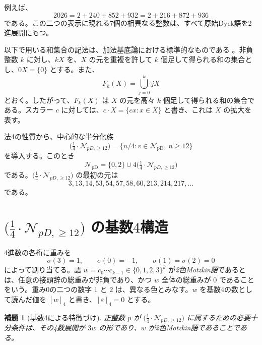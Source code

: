 \documentclass[12pt]{ltjsarticle}
\theoremstyle{plain}
\newtheorem{lemma}[theorem]{補題}
\theoremstyle{definition}
\theoremstyle{plain}
\newcommand{\NpD}{\mathcal{N}_{\mathrm{pD}}}
\newcommand{\Pset}{
  \bigl(\tfrac{1}{4}\cdot\mathcal{N}_{pD,\geq 12}\bigr)
}
\begin{document}
例えば、
\[
 2026=2+240+852+932=2+216+872+936
\]
である。この二つの表示に現れる7個の相異なる整数は、すべて原始Dyck語を2進展開にもつ。

以下で用いる和集合の記法は、加法基底論における標準的なものである \cite[Chap.\ 1]{Nathanson}。非負整数 $k$ に対し、$kX$ を、$X$ の元を重複を許して $k$ 個足して得られる和の集合とし、$0X=\{0\}$ とする。また、
\[
 F_k(X)=\bigcup_{j=0}^{k}jX
\]
とおく。したがって、$F_k(X)$ は $X$ の元を高々 $k$ 個足して得られる和の集合である。スカラー $c$ に対しては、$c\cdot X=\{cx:x\in X\}$ と書き、これは $X$ の拡大を表す。

法4の性質から、中心的な半分化族
\begin{equation}\label{eq:P-def}
 \Pset=\{n/4:v\in\NpD,\ n\geq12\}
\end{equation}
を導入する。このとき
\begin{equation}\label{eq:NpD-decomp}
 \NpD=\{0,2\}\cup4\Pset
\end{equation}
である。$\Pset$ の最初の元は
\[
 3,13,14,53,54,57,58,60,213,214,217,\ldots
\]
である。

\section{\texorpdfstring{$\Pset$}{P} の基数\texorpdfstring{$4$}{4}構造}\label{sec:base4}

4進数の各桁に重みを
\[
  \sigma(3)=1,\qquad \sigma(0)=-1,\qquad
  \sigma(1)=\sigma(2)=0
\]
によって割り当てる。語 $w=c_0\cdots c_{k-1}\in\{0,1,2,3\}^{k}$ が\emph{2色Motzkin語}であるとは、任意の接頭辞の総重みが非負であり、かつ $w$ 全体の総重みが $0$ であることをいう。重み0の二つの数字 $1$ と $2$ は、異なる色とみなす。$w$ を基数4の数として読んだ値を $[w]_4$ と書き、$[\varepsilon]_4=0$ とする。

\begin{lemma}[基数4による特徴づけ]\label{lem:base4}
正整数 $p$ が $\Pset$ に属するための必要十分条件は、その4数展開が $3w$ の形であり、$w$ が2色Motzkin語であることである。
\end{lemma}
\end{document}
